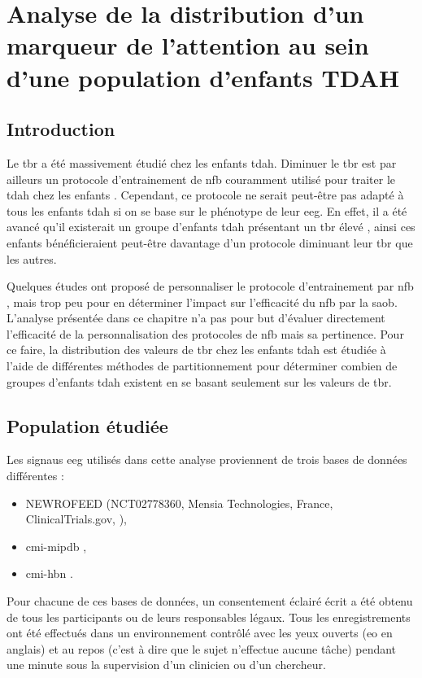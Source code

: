 \chapter{Analyse de la distribution d'un marqueur de l'attention au sein d'une population d'enfants TDAH}

\section*{Introduction}
Le \gls{tbr} a été massivement étudié chez les enfants \gls{tdah}. Diminuer le \gls{tbr} est par ailleurs un protocole d'entrainement de \gls{nfb} couramment utilisé 
pour traiter le \gls{tdah} chez les enfants \citep{Arnold2014, Deilami2016, Gevensleben2009, VanDongen2013}. Cependant, ce protocole ne serait peut-être pas adapté à tous les enfants \gls{tdah} si 
on se base sur le phénotype de leur \gls{eeg}. En effet, il a été avancé qu'il existerait un groupe d'enfants \gls{tdah} présentant un \gls{tbr} élevé 
\citep{Zhang2017, Clarke2011}, ainsi ces enfants bénéficieraient peut-être davantage d'un protocole diminuant leur \gls{tbr} que les autres. 

Quelques études ont proposé de personnaliser le protocole d'entrainement par \gls{nfb} \citep{Bazanova2018, Escolano2014}, mais trop peu pour en déterminer
l'impact sur l'efficacité du \gls{nfb} par la \gls{saob}. L'analyse présentée dans ce chapitre n'a pas pour but d'évaluer directement l'efficacité de la 
personnalisation des protocoles de \gls{nfb} mais sa pertinence. Pour ce faire, la distribution des valeurs de \gls{tbr} chez les enfants \gls{tdah} est 
étudiée à l'aide de différentes méthodes de partitionnement pour déterminer combien de groupes d'enfants \gls{tdah} existent en se basant seulement sur les 
valeurs de \gls{tbr}. 

\section{Population étudiée}

Les signaus \gls{eeg} utilisés dans cette analyse proviennent de trois bases de données différentes :
\begin{itemize}
\item NEWROFEED (NCT02778360, Mensia Technologies, France, ClinicalTrials.gov, \citet{Bioulac2019}),
\item \gls{cmi-mipdb} \citep{Langer2017, Langer2017b},
\item \gls{cmi-hbn} \citep{Alexander2017, Alexander2017b}.
\end{itemize}
Pour chacune de ces bases de données, un consentement éclairé écrit a été obtenu de tous les participants ou de leurs responsables légaux. Tous les enregistrements
ont été effectués dans un environnement contrôlé avec les yeux ouverts (\gls{eo} en anglais) et au repos (c'est à dire que le sujet n'effectue aucune tâche) 
pendant une minute sous la supervision d'un clinicien ou d'un chercheur. 

